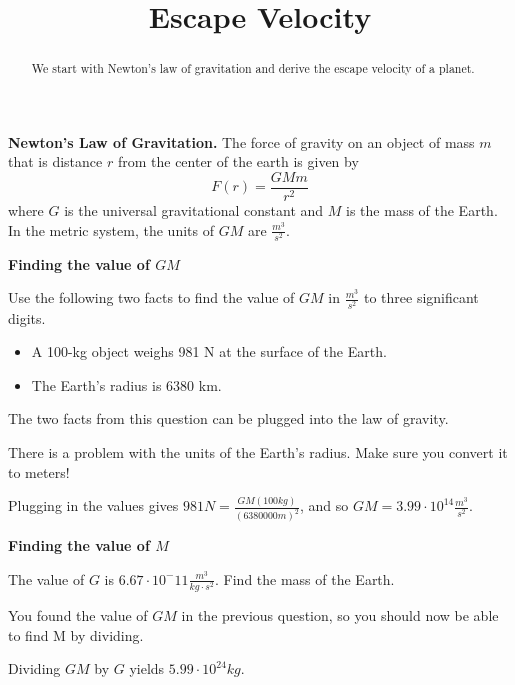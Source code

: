 \documentclass{ximera}
\title{Escape Velocity}
\begin{document}
\begin{abstract}
We start with Newton's law of gravitation and derive the escape velocity of a planet.
\end{abstract}
\maketitle

\begin{observation}
\textbf{Newton's Law of Gravitation.} The force of gravity on an object of mass $m$ that is distance $r$ from the center of the earth is given by
$$ F(r) = \frac{G M m}{r^2}$$
where $G$ is the universal gravitational constant and $M$ is the mass of the Earth. In the metric system, the units of $G M$ are $\frac{m^3}{s^2}$.
\end{observation}

\textbf{Finding the value of $GM$}

\begin{question}
Use the following two facts to find the value of $GM$ in $\frac{m^3}{s^2}$ to three significant digits. 
\begin{itemize}
\item A 100-kg object weighs 981 N at the surface of the Earth.
\item The Earth's radius is 6380 km.
\end{itemize}
\begin{solution}
\begin{multiple-choice}
\end{multiple-choice}
\begin{hint}
The two facts from this question can be plugged into the law of gravity.
\end{hint}
\begin{hint}
There is a problem with the units of the Earth's radius. Make sure you convert it to meters!
\end{hint}
Plugging in the values gives $981 N = \frac{GM (100 kg)}{(6380000 m)^2}$, and so $GM = 3.99 \cdot 10^{14} \frac{m^3}{s^2}$.
\end{solution}
\end{question}

\textbf{Finding the value of $M$}

\begin{question}
The value of $G$ is $6.67 \cdot 10^-{11} \frac{m^3}{kg \cdot s^2}$. Find the mass of the Earth.
\begin{solution}
\begin{multiple-choice}
\end{multiple-choice}
\begin{hint}
You found the value of $G M$ in the previous question, so you should now be able to find M by dividing.
\end{hint}
Dividing $G M$ by $G$ yields $5.99 \cdot 10^{24} kg$.
\end{solution}
\end{question}
\end{document}
